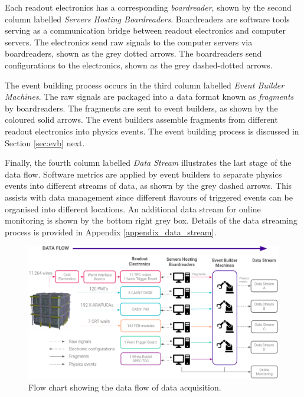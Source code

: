 Each readout electronics has a corresponding \textit{boardreader}, shown by the second column labelled \textit{Servers Hosting Boardreaders}.
Boardreaders are software tools serving as a communication bridge between readout electronics and computer servers.
The electronics send raw signals to the computer servers via boardreaders, shown as the grey dotted arrows.
The boardreaders send configurations to the electronics, shown as the grey dashed-dotted arrows.

The event building process occurs in the third column labelled \textit{Event Builder Machines}.
The raw signals are packaged into a data format known as \textit{fragments} by boardreaders.
The fragments are sent to event builders, as shown by the coloured solid arrows.
The event builders assemble fragments from different readout electronics into physics events.
The event building process is discussed in Section \ref{sec:evb} next.
                        
Finally, the fourth column labelled \textit{Data Stream} illustrates the last stage of the data flow.
Software metrics are applied by event builders to separate physics events into different streams of data, as shown by the grey dashed arrows.
This assists with data management since different flavours of triggered events can be organised into different locations.
An additional data stream for online monitoring is shown by the bottom right grey box.
Details of the data streaming process is provided in Appendix \ref{appendix_data_stream}.

\begin{figure}[ht!] 
\centering    
\includegraphics[width=1.0\textwidth]{DAQ_Overview}
\caption[Data Acquision Flow Chart]{
Flow chart showing the data flow of data acquisition.
}
\label{fig:daqOverview}
\end{figure}

